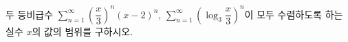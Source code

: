 두 등비급수 $\displaystyle\sum_{n=1}^{\infty}\left(\dfrac{x}{3}\right)^n(x-2)^n$, $\displaystyle\sum_{n=1}^{\infty}\left(\log_3\dfrac{x}{3}\right)^n$이 모두 수렴하도록 하는 실수 $x$의 값의 범위를 구하시오.
